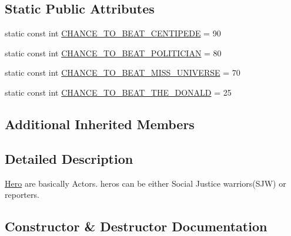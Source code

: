 \subsection*{Static Public Attributes}
\begin{DoxyCompactItemize}
\item 
static const int \hyperlink{classHero_a79603131508da3c95d82594ff29ccb32}{C\+H\+A\+N\+C\+E\+\_\+\+T\+O\+\_\+\+B\+E\+A\+T\+\_\+\+C\+E\+N\+T\+I\+P\+E\+DE} = 90
\item 
static const int \hyperlink{classHero_a8fe3d6c05946b15de5b08e912fe226fc}{C\+H\+A\+N\+C\+E\+\_\+\+T\+O\+\_\+\+B\+E\+A\+T\+\_\+\+P\+O\+L\+I\+T\+I\+C\+I\+AN} = 80
\item 
static const int \hyperlink{classHero_a13075687fe82d8eee2bd7ef77222ca4f}{C\+H\+A\+N\+C\+E\+\_\+\+T\+O\+\_\+\+B\+E\+A\+T\+\_\+\+M\+I\+S\+S\+\_\+\+U\+N\+I\+V\+E\+R\+SE} = 70
\item 
static const int \hyperlink{classHero_a470885608dec7243532ca656b52feead}{C\+H\+A\+N\+C\+E\+\_\+\+T\+O\+\_\+\+B\+E\+A\+T\+\_\+\+T\+H\+E\+\_\+\+D\+O\+N\+A\+LD} = 25
\end{DoxyCompactItemize}
\subsection*{Additional Inherited Members}


\subsection{Detailed Description}
\hyperlink{classHero}{Hero} are basically Actors. hero\textquotesingle{}s can be either Social Justice warriors(\+S\+J\+W) or reporters. 

\subsection{Constructor \& Destructor Documentation}
